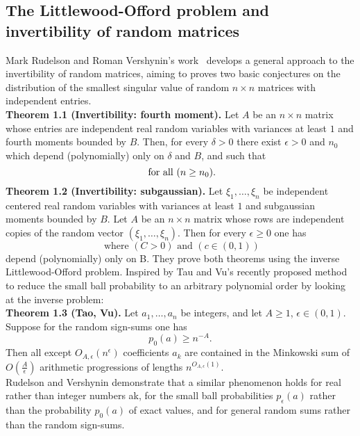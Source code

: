 \subsection{The Littlewood-Offord problem and invertibility of random matrices}
Mark Rudelson and Roman Vershynin's work~\cite{rudelson2008littlewood} develops a general approach to the invertibility of random matrices, aiming to proves two basic conjectures on the distribution of the smallest singular value of random \(n \times n\) matrices with independent entries.\\\newline
\textbf{Theorem 1.1 (Invertibility: fourth moment).} Let \(A\) be an \(n \times n\) matrix whose entries are independent real random variables with variances at least \(1\) and fourth moments bounded by \(B\). Then, for every \(\delta > 0\) there exist \(\epsilon > 0\) and \(n_0\) which depend (polynomially) only on \(\delta\) and \(B\), and such that
\begin{equation*}
    [P(s_n(A) \leq \epsilon n^{-1/2}) \leq \delta] \text{ for all } (n \geq n_0).\\
\end{equation*}
\textbf{Theorem 1.2 (Invertibility: subgaussian).} Let \(\xi_1, \ldots, \xi_n\) be independent centered real random variables with variances at least \(1\) and subgaussian moments bounded by \(B\). Let \(A\) be an \(n \times n\) matrix whose rows are independent copies of the random vector \((\xi_1, \ldots, \xi_n)\). Then for every \(\epsilon \geq 0\) one has
\begin{equation*}
    [P(s_n(A) \leq \epsilon n^{-1/2}) \leq C\epsilon + c^n,] \text{ where } (C > 0) \text{ and } (c \in (0, 1)) 
\end{equation*}
depend (polynomially) only on B.
They prove both theorems using the inverse Littlewood-Offord problem. Inspired by Tau and Vu's recently proposed method to reduce the small ball probability to an arbitrary polynomial order by looking at the inverse problem:\\\newline
\textbf{Theorem 1.3 (Tao, Vu).} Let \(a_1, \ldots, a_n\) be integers, and let \(A \geq 1\), \(\epsilon \in (0, 1)\). Suppose for the random sign-sums one has
\[p_0(a) \geq n^{-A}.\]
Then all except \(O_{A,\epsilon}(n^{\epsilon})\) coefficients \(a_k\) are contained in the Minkowski sum of \(O\left(\frac{A}{\epsilon}\right)\) arithmetic progressions of lengths \(n^{O_{A,\epsilon}(1)}\).\\
Rudelson and Vershynin demonstrate that a similar phenomenon holds for real rather than integer numbers ak, for the small ball probabilities \(p_{\epsilon}(a)\) rather than the probability \(p_{0}(a)\) of exact values, and for general random sums rather than the random sign-sums.\\\newline
